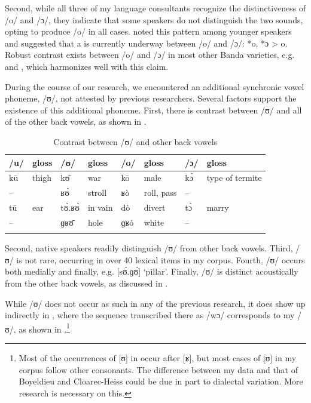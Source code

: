 \documentclass[output=paper,colorlinks,citecolor=brown]{langscibook}
\begin{document}
Second, while all three of my language consultants recognize the distinctiveness of /o/ and /ɔ/, they indicate that some  speakers do not distinguish the two sounds, opting to produce /o/ in all cases. \citet[9]{Théret-Kieschke1998} noted this pattern among younger speakers and suggested that a  is currently underway between /o/ and /ɔ/: *o, *ɔ > o. Robust contrast exists between /o/ and /ɔ/ in most other Banda  varieties, e.g.  \citep{BoyeldieuCloarec-Heiss2001} and  \citep{Olson2005}, which harmonizes well with this claim.

During the course of our research, we encountered an additional synchronic vowel phoneme, /ʊ/, not attested by previous researchers. Several factors support the existence of this additional phoneme. First, there is contrast between /ʊ/ and all of the other back vowels, as shown in .

\begin{table}
\caption{Contrast between /ʊ/ and other back vowels}
\label{tab:olson:8}
    \begin{tabularx}{\textwidth}{lQlQlQlQ}
    \lsptoprule
        /u/     & gloss & /ʊ/ & gloss & /o/ & gloss & /ɔ/ & gloss\\
    \midrule
        kū      & thigh & kʊ̄ & war & kō & male & kɔ̀ & type of termite\\
        --     & & ʁʊ̀ & stroll & ʁò & roll, pass & -- & \\
        tū      & ear & tʊ̀.ʁʊ̀ & in vain & dò & divert & tɔ̀ & marry\\
        --     & & ɡʁʊ̄ & hole & ɡʁó & white & -- & \\
    \lspbottomrule
    \end{tabularx}
\end{table}

Second, native speakers readily distinguish /ʊ/ from other back vowels. Third, /ʊ/ is not rare, occurring in over 40 lexical items in my corpus. Fourth, /ʊ/ occurs both medially and finally, e.g. [sʊ̀.ɡʊ́] ‘pillar’. Finally, /ʊ/ is distinct acoustically from the other back vowels, as discussed in .

While /ʊ/ does not occur as such in any of the previous research, it does show up indirectly in \citet{BoyeldieuCloarec-Heiss2001}, where the sequence transcribed there as /wɔ/ corresponds to my /ʊ/, as shown in .\footnote{Most of the occurrences of [ʊ] in  occur after [ʁ], but most cases of [ʊ] in my corpus follow other consonants. The difference between my data and that of Boyeldieu and Cloarec-Heiss could be due in part to dialectal variation. More research is necessary on this.}
\end{document}

